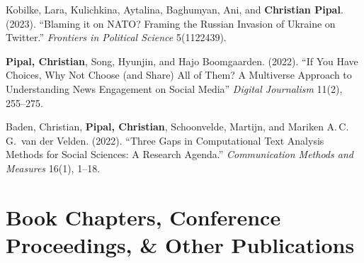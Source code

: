 \documentclass[11pt,a4paper]{article}
\begin{document}
\begin{enumerate}[leftmargin=2em, label={[\arabic*]}]
\item Kobilke, Lara, Kulichkina, Aytalina, Baghumyan, Ani, and \textbf{Christian Pipal}. (2023). ``Blaming it on NATO? Framing the Russian Invasion of Ukraine on Twitter.'' \textit{Frontiers in Political Science} 5(1122439).

\item \textbf{Pipal, Christian}, Song, Hyunjin, and Hajo Boomgaarden. (2022). ``If You Have Choices, Why Not Choose (and Share) All of Them? A Multiverse Approach to Understanding News Engagement on Social Media'' \textit{Digital Journalism} 11(2), 255--275.

\item Baden, Christian, \textbf{Pipal, Christian}, Schoonvelde, Martijn, and Mariken A.\,C.\,G.\ van der Velden. (2022). ``Three Gaps in Computational Text Analysis Methods for Social Sciences: A Research Agenda.'' \textit{Communication Methods and Measures} 16(1), 1--18.
\end{enumerate}


\section{Book Chapters, Conference Proceedings, \& Other Publications}
\end{document}
